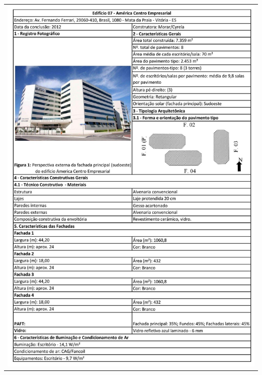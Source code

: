 \begin{table}[H]
    \centering
    \begin{tabular}{l}
        \includegraphics[width=\textwidth]{figures/appendices/edificio07.jpg}
    \end{tabular}
\end{table}
\pagebreak
